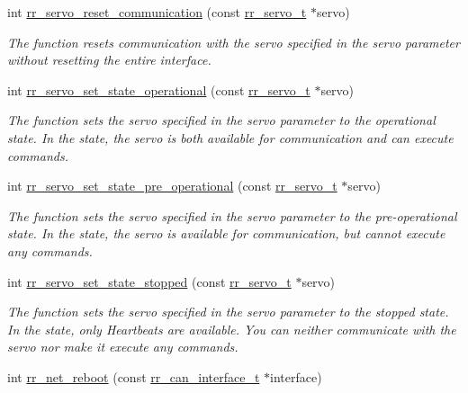 \begin{DoxyCompactItemize}
int \hyperlink{group___state_ga59060b95f6ee0614cbec3500ba08b7a0}{rr\+\_\+servo\+\_\+reset\+\_\+communication} (const \hyperlink{structrr__servo__t}{rr\+\_\+servo\+\_\+t} $\ast$servo)
\begin{DoxyCompactList}\small\item\em The function resets communication with the servo specified in the \textquotesingle{}servo\textquotesingle{} parameter without resetting the entire interface. \end{DoxyCompactList}\item 
int \hyperlink{group___state_ga799d61d6eb811cba7f9097a5d9bfd0a8}{rr\+\_\+servo\+\_\+set\+\_\+state\+\_\+operational} (const \hyperlink{structrr__servo__t}{rr\+\_\+servo\+\_\+t} $\ast$servo)
\begin{DoxyCompactList}\small\item\em The function sets the servo specified in the \textquotesingle{}servo\textquotesingle{} parameter to the operational state. In the state, the servo is both available for communication and can execute commands. \end{DoxyCompactList}\item 
int \hyperlink{group___state_ga39559219bfb36d4d9359365ac3656a74}{rr\+\_\+servo\+\_\+set\+\_\+state\+\_\+pre\+\_\+operational} (const \hyperlink{structrr__servo__t}{rr\+\_\+servo\+\_\+t} $\ast$servo)
\begin{DoxyCompactList}\small\item\em The function sets the servo specified in the \textquotesingle{}servo\textquotesingle{} parameter to the pre-\/operational state. In the state, the servo is available for communication, but cannot execute any commands. \end{DoxyCompactList}\item 
int \hyperlink{group___state_ga02ca530236f87db0fcac9e136eafda4d}{rr\+\_\+servo\+\_\+set\+\_\+state\+\_\+stopped} (const \hyperlink{structrr__servo__t}{rr\+\_\+servo\+\_\+t} $\ast$servo)
\begin{DoxyCompactList}\small\item\em The function sets the servo specified in the \textquotesingle{}servo\textquotesingle{} parameter to the stopped state. In the state, only Heartbeats are available. You can neither communicate with the servo nor make it execute any commands. \end{DoxyCompactList}\item 
int \hyperlink{group___state_ga3141174e38250e0107cc6de9681bcc47}{rr\+\_\+net\+\_\+reboot} (const \hyperlink{structrr__can__interface__t}{rr\+\_\+can\+\_\+interface\+\_\+t} $\ast$interface)

\end{DoxyCompactItemize}

